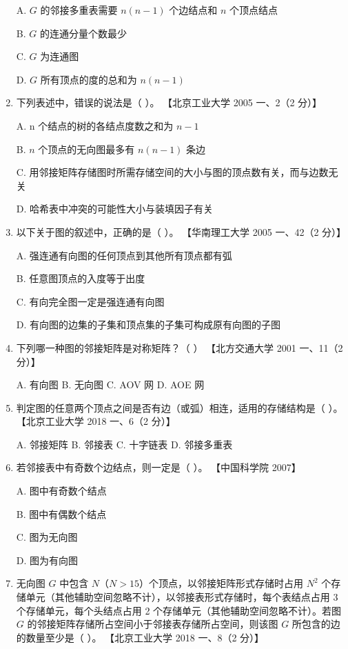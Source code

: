 \documentclass[lang=cn,newtx,10pt,scheme=chinese]{elegantbook}
\begin{document}
\begin{enumerate}
        A. $G$ 的邻接多重表需要 $n(n-1)$ 个边结点和 $n$ 个顶点结点  

        B. $G$ 的连通分量个数最少  

        C. $G$ 为连通图  

        D. $G$ 所有顶点的度的总和为 $n(n-1)$  
    
        \item 下列表述中，错误的说法是（ ）。  
        【北京工业大学 2005 一、2（2 分）】  

        A. n 个结点的树的各结点度数之和为 $n-1$  

        B. $n$ 个顶点的无向图最多有 $n(n-1)$ 条边  

        C. 用邻接矩阵存储图时所需存储空间的大小与图的顶点数有关，而与边数无关  

        D. 哈希表中冲突的可能性大小与装填因子有关  
    
        \item 以下关于图的叙述中，正确的是（ ）。  
        【华南理工大学 2005 一、42（2 分）】  

        A. 强连通有向图的任何顶点到其他所有顶点都有弧  

        B. 任意图顶点的入度等于出度  

        C. 有向完全图一定是强连通有向图  

        D. 有向图的边集的子集和顶点集的子集可构成原有向图的子图  
    
        \item 下列哪一种图的邻接矩阵是对称矩阵？（ ）  
        【北方交通大学 2001 一、11（2 分）】  

        A. 有向图 \quad B. 无向图 \quad C. AOV 网 \quad D. AOE 网  
    
        \item 判定图的任意两个顶点之间是否有边（或弧）相连，适用的存储结构是（ ）。  
        【北京工业大学 2018 一、6（2 分）】  

        A. 邻接矩阵 \quad B. 邻接表 \quad C. 十字链表 \quad D. 邻接多重表  
    
        \item 若邻接表中有奇数个边结点，则一定是（ ）。  
        【中国科学院 2007】  

        A. 图中有奇数个结点  

        B. 图中有偶数个结点  

        C. 图为无向图  

        D. 图为有向图  
    
        \item 无向图 $G$ 中包含 $N$（$N > 15$）个顶点，以邻接矩阵形式存储时占用 $N^2$ 个存储单元（其他辅助空间忽略不计），以邻接表形式存储时，每个表结点占用 3 个存储单元，每个头结点占用 2 个存储单元（其他辅助空间忽略不计）。若图 $G$ 的邻接矩阵存储所占空间小于邻接表存储所占空间，则该图 $G$ 所包含的边的数量至少是（ ）。  
        【北京工业大学 2018 一、8（2 分）】  


\end{enumerate}
\end{document}
